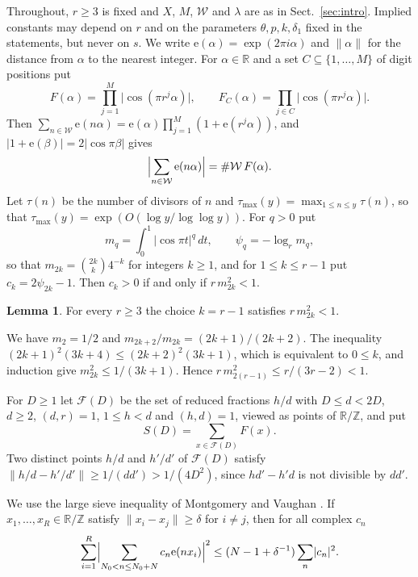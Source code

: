 \documentclass[11pt]{amsart}
\makeatletter
\theoremstyle{definition}
\newtheorem{lemma}[theorem]{Lemma}
\numberwithin{equation}{section}
\renewenvironment{proof}[1][\proofname]{\par\pushQED{\qed}\normalfont\topsep6\p@\@plus6\p@\relax\trivlist\item[\hskip\labelsep\upshape#1.]\ignorespaces}{\popQED\endtrivlist\@endpefalse}
\newcommand{\e}{\mathrm{e}}
\newcommand{\R}{\mathbb{R}}
\newcommand{\Z}{\mathbb{Z}}
\newcommand{\WW}{\mathcal{W}}
\newcommand{\FF}{\mathscr{F}}
\newcommand{\tmax}{\tau_{\max}}
\newcommand{\norm}[1]{\lVert #1\rVert}
\makeatother
\begin{document}
Throughout, $r\ge3$ is fixed and $X$, $M$, $\WW$ and $\lambda$ are as in Sect.~\ref{sec:intro}. Implied constants may depend on $r$ and on the parameters $\theta,p,k,\delta_1$ fixed in the statements, but never on $s$. We write $\e(\alpha)=\exp(2\pi i\alpha)$ and $\norm{\alpha}$ for the distance from $\alpha$ to the nearest integer. For $\alpha\in\R$ and a set $C\subseteq\{1,\dots,M\}$ of digit positions put
\[
F(\alpha)=\prod_{j=1}^{M}\lvert\cos(\pi r^j\alpha)\rvert,\qquad F_C(\alpha)=\prod_{j\in C}\lvert\cos(\pi r^j\alpha)\rvert.
\]
Then $\sum_{n\in\WW}\e(n\alpha)=\e(\alpha)\prod_{j=1}^M(1+\e(r^j\alpha))$, and $\lvert1+\e(\beta)\rvert=2\lvert\cos\pi\beta\rvert$ gives
\begin{equation}\label{eq:FT}
\Bigl|\sum_{n\in\WW}\e(n\alpha)\Bigr|=\#\WW\,F(\alpha).
\end{equation}
Let $\tau(n)$ be the number of divisors of $n$ and $\tmax(y)=\max_{1\le n\le y}\tau(n)$, so that $\tmax(y)=\exp(O(\log y/\log\log y))$. For $q>0$ put
\[
m_q=\int_0^1\lvert\cos\pi t\rvert^q\,dt,\qquad\psi_q=-\log_rm_q,
\]
so that $m_{2k}=\binom{2k}{k}4^{-k}$ for integers $k\ge1$, and for $1\le k\le r-1$ put $c_k=2\psi_{2k}-1$. Then $c_k>0$ if and only if $r\,m_{2k}^2<1$.

\begin{lemma}\label{lem:k}
For every $r\ge3$ the choice $k=r-1$ satisfies $r\,m_{2k}^2<1$.
\end{lemma}

\begin{proof}
We have $m_2=1/2$ and $m_{2k+2}/m_{2k}=(2k+1)/(2k+2)$. The inequality $(2k+1)^2(3k+4)\le(2k+2)^2(3k+1)$, which is equivalent to $0\le k$, and induction give $m_{2k}^2\le1/(3k+1)$. Hence $r\,m_{2(r-1)}^2\le r/(3r-2)<1$.
\end{proof}

For $D\ge1$ let $\FF(D)$ be the set of reduced fractions $h/d$ with $D\le d<2D$, $d\ge2$, $(d,r)=1$, $1\le h<d$ and $(h,d)=1$, viewed as points of $\R/\Z$, and put
\[
S(D)=\sum_{x\in\FF(D)}F(x).
\]
Two distinct points $h/d$ and $h'/d'$ of $\FF(D)$ satisfy $\norm{h/d-h'/d'}\ge1/(dd')>1/(4D^2)$, since $hd'-h'd$ is not divisible by $dd'$.

We use the large sieve inequality of Montgomery and Vaughan \cite{MV}. If $x_1,\dots,x_R\in\R/\Z$ satisfy $\norm{x_i-x_j}\ge\delta$ for $i\ne j$, then for all complex $c_n$
\begin{equation}\label{eq:LS}
\sum_{i=1}^R\Bigl|\sum_{N_0<n\le N_0+N}c_n\e(nx_i)\Bigr|^2\le(N-1+\delta^{-1})\sum_n\lvert c_n\rvert^2.
\end{equation}
\end{document}
